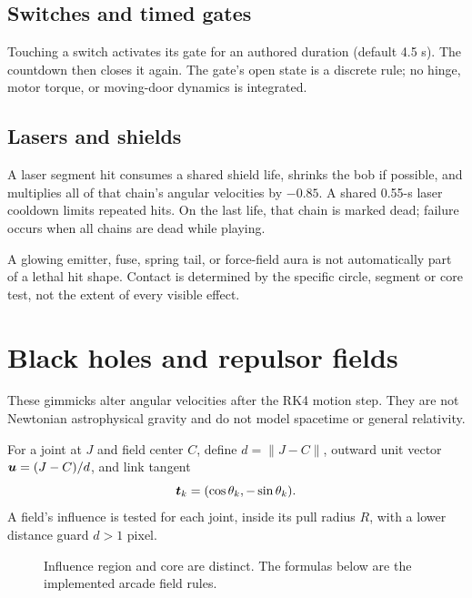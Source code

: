 \documentclass[11pt,a4paper]{article}
\begin{document}
\subsection{Switches and timed gates}
Touching a switch activates its gate for an authored duration (default 4.5 s). The countdown then closes it again. The gate's open state is a discrete rule; no hinge, motor torque, or moving-door dynamics is integrated.
\subsection{Lasers and shields}
A laser segment hit consumes a shared shield life, shrinks the bob if possible, and multiplies all of that chain's angular velocities by \(-0.85\). A shared 0.55-s laser cooldown limits repeated hits. On the last life, that chain is marked dead; failure occurs when all chains are dead while playing.

A glowing emitter, fuse, spring tail, or force-field aura is not automatically part of a lethal hit shape. Contact is determined by the specific circle, segment or core test, not the extent of every visible effect.

\section{Black holes and repulsor fields}
These gimmicks alter angular velocities after the RK4 motion step. They are not Newtonian astrophysical gravity and do not model spacetime or general relativity.

For a joint at \(J\) and field center \(C\), define \(d=\lVert J-C\rVert\), outward unit vector \(\boldsymbol{u}=(J-C)/d\), and link tangent
\[
 \boldsymbol{t}_k=(\cos\theta_k,-\sin\theta_k).
\]
A field's influence is tested for each joint, inside its pull radius \(R\), with a lower distance guard \(d>1\) pixel.
\begin{figure}[H]\centering
{}\caption{Influence region and core are distinct. The formulas below are the implemented arcade field rules.}
\end{figure}
\end{document}

